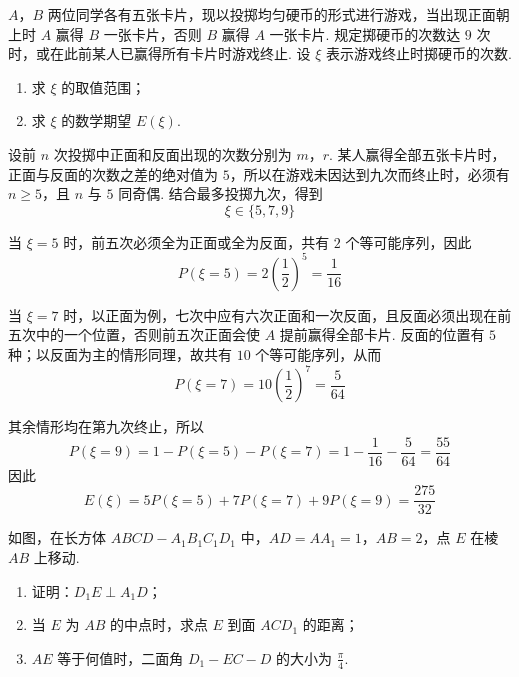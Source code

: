 \begin{problem}
\(A\)，\(B\) 两位同学各有五张卡片，现以投掷均匀硬币的形式进行游戏，当出现正面朝上时 \(A\) 赢得 \(B\) 一张卡片，否则 \(B\) 赢得 \(A\) 一张卡片. 规定掷硬币的次数达 \(9\) 次时，或在此前某人已赢得所有卡片时游戏终止. 设 \(\xi\) 表示游戏终止时掷硬币的次数.

\begin{enumerate}
\item 求 \(\xi\) 的取值范围；
\item 求 \(\xi\) 的数学期望 \(E(\xi)\).
\end{enumerate}
\end{problem}

\begin{solution}
设前 \(n\) 次投掷中正面和反面出现的次数分别为 \(m\)，\(r\). 某人赢得全部五张卡片时，正面与反面的次数之差的绝对值为 \(5\)，所以在游戏未因达到九次而终止时，必须有 \(n\geqslant5\)，且 \(n\) 与 \(5\) 同奇偶. 结合最多投掷九次，得到
\[
\xi\in\{5,7,9\}
\]

当 \(\xi=5\) 时，前五次必须全为正面或全为反面，共有 \(2\) 个等可能序列，因此
\[
P(\xi=5)=2\left(\frac12\right)^5=\frac1{16}
\]

当 \(\xi=7\) 时，以正面为例，七次中应有六次正面和一次反面，且反面必须出现在前五次中的一个位置，否则前五次正面会使 \(A\) 提前赢得全部卡片. 反面的位置有 \(5\) 种；以反面为主的情形同理，故共有 \(10\) 个等可能序列，从而
\[
P(\xi=7)=10\left(\frac12\right)^7=\frac5{64}
\]

其余情形均在第九次终止，所以
\[
P(\xi=9)=1-P(\xi=5)-P(\xi=7)=1-\frac1{16}-\frac5{64}=\frac{55}{64}
\]
因此
\[
E(\xi)=5P(\xi=5)+7P(\xi=7)+9P(\xi=9)=\frac{275}{32}
\]
\end{solution}

\begin{problem}
如图，在长方体 \(ABCD-A_{1}B_{1}C_{1}D_{1}\) 中，\(AD=AA_{1}=1\)，\(AB=2\)，点 \(E\) 在棱 \(AB\) 上移动.

\begin{enumerate}
\item 证明：\(D_{1}E\perp A_{1}D\)；
\item 当 \(E\) 为 \(AB\) 的中点时，求点 \(E\) 到面 \(ACD_{1}\) 的距离；
\item \(AE\) 等于何值时，二面角 \(D_{1}-EC-D\) 的大小为 \(\frac{\pi}{4}\).
\end{enumerate}

\end{problem}

